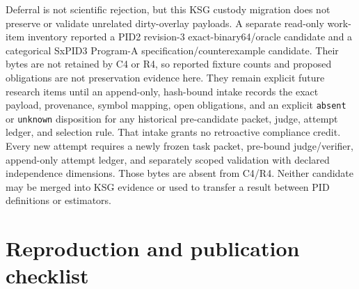 \documentclass[11pt,a4paper]{article}
\begin{document}
Deferral is not scientific rejection, but this KSG custody migration does not preserve or validate
unrelated dirty-overlay payloads.  A separate read-only work-item inventory reported a PID2
revision-3 exact-binary64/oracle candidate and a categorical SxPID3 Program-A
specification/counterexample candidate.  Their bytes are not retained by C4 or R4, so reported
fixture counts and proposed obligations are not preservation evidence here.  They remain explicit
future research items until an append-only, hash-bound intake records the exact payload,
provenance, symbol mapping, open obligations, and an explicit \texttt{absent} or \texttt{unknown}
disposition for any historical pre-candidate packet, judge, attempt ledger, and selection rule.
That intake grants no retroactive compliance credit. Every new attempt requires a newly frozen
task packet, pre-bound judge/verifier, append-only attempt ledger, and separately scoped validation
with declared independence dimensions. Those bytes are absent from C4/R4. Neither candidate may
be merged into KSG evidence or used to transfer a result between PID definitions or estimators.

\section{Reproduction and publication checklist}
\end{document}
